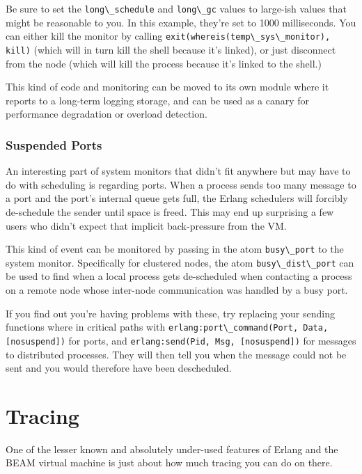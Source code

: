 \documentclass[11pt, oneside]{book}   	%
\newcommand{\function}[1]{\Verb`#1`}
\newcommand{\expression}[1]{\Verb`#1`}
\newcommand{\term}[1]{\Verb`#1`}
\begin{document}
Be sure to set the \term{long\_schedule} and \term{long\_gc} values to large-ish values that might be reasonable to you. In this example, they're set to 1000 milliseconds. You can either kill the monitor by calling \expression{exit(whereis(temp\_sys\_monitor), kill)} (which will in turn kill the shell because it's linked), or just disconnect from the node (which will kill the process because it's linked to the shell.)

This kind of code and monitoring can be moved to its own module where it reports to a long-term logging storage, and can be used as a canary for performance degradation or overload detection.

\subsection{Suspended Ports}
\label{subsec:port-system-monitors}

An interesting part of system monitors that didn't fit anywhere but may have to do with scheduling is regarding ports. When a process sends too many message to a port and the port's internal queue gets full, the Erlang schedulers will forcibly de-schedule the sender until space is freed. This may end up surprising a few users who didn't expect that implicit back-pressure from the VM.

This kind of event can be monitored by passing in the atom \term{busy\_port} to the system monitor. Specifically for clustered nodes, the atom \term{busy\_dist\_port} can be used to find when a local process gets de-scheduled when contacting a process on a remote node whose inter-node communication was handled by a busy port.

If you find out you're having problems with these, try replacing your sending functions where in critical paths with \function{erlang:port\_command(Port, Data, [nosuspend])} for ports, and \function{erlang:send(Pid, Msg, [nosuspend])} for messages to distributed processes. They will then tell you when the message could not be sent and you would therefore have been descheduled.



\chapter{Tracing}
\label{chap:tracing}

One of the lesser known and absolutely under-used features of Erlang and the BEAM virtual machine is just about how much tracing you can do on there.
\end{document}
